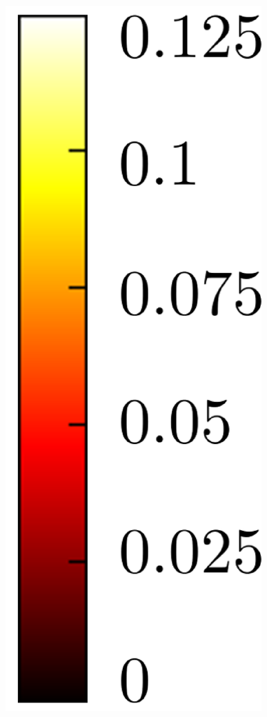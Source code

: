 \begin{figure}[t]
\begin{center}
\begin{minipage}{0.050\hsize}
			\centerline{\includegraphics[width=\hsize]{./result_image/colorbar_hot}} %
		\end{minipage}
		

\end{center}
\end{figure}
